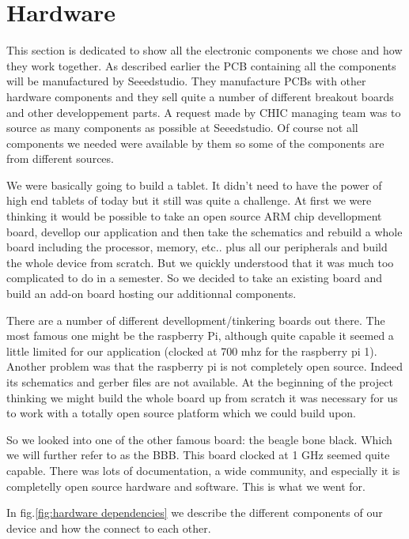 \section{Hardware}

This section is dedicated to show all the electronic components we chose and how they work together. As described earlier the PCB containing all the components will be manufactured by Seeedstudio. They manufacture PCBs with other hardware components and they sell quite a number of different breakout boards and other developpement parts. A request made by CHIC managing team was to source as many components as possible at Seeedstudio. Of course not all components we needed were available by them so some of the components are from different sources.

We were basically going to build a tablet. It didn't need to have the power of high end tablets of today but it still was quite a challenge. At first we were thinking it would be possible to take an open source ARM chip devellopment board, devellop our application and then take the schematics and rebuild a whole board including the processor, memory, etc.. plus all our peripherals and build the whole device from scratch. But we quickly understood that it was much too complicated to do in a semester. So we decided to take an existing board and build an add-on board hosting our additionnal components.

There are a number of different devellopment/tinkering boards out there. The most famous one might be the raspberry Pi, although quite capable it seemed a little limited for our application (clocked at 700 mhz for the raspberry pi 1). Another problem was that the raspberry pi is not completely open source. Indeed its schematics and gerber files are not available. At the beginning of the project thinking we might build the whole board up from scratch it was necessary for us to work with a totally open source platform which we could build upon.

So we looked into one of the other famous board: the beagle bone black. Which we will further refer to as the BBB. This board clocked at 1 GHz seemed quite capable. There was lots of documentation, a wide community, and especially it is completelly open source hardware and software. This is what we went for.

In fig.\ref{fig:hardware dependencies} we describe the different components of our device and how the connect to each other.


